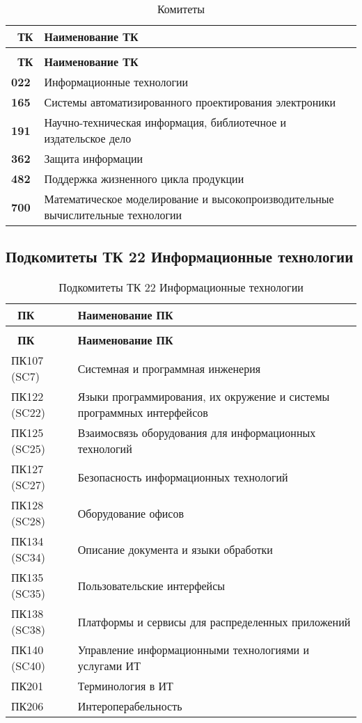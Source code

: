\begin{longtable}{|p{2cm}|p{14cm}|}
	\caption{Комитеты} \label{table:tk} \\
	\hline
	\textbf{\No\ ТК}
	& \textbf{Наименование ТК} \\
	\hline
	\endfirsthead
	\conttable{table:tk} \\
	\hline
	\textbf{\No\ ТК}
	& \textbf{Наименование ТК} \\
	\hline
	\endhead
	\textbf{022} & Информационные технологии \\ \hline
	\textbf{165}
	& Системы автоматизированного проектирования электроники \\ \hline
	\textbf{191}
	& Научно-техническая информация, библиотечное и издательское дело \\ \hline
	\textbf{362}
	& Защита информации \\ \hline
	\textbf{482}
	& Поддержка жизненного цикла продукции \\ \hline
	\textbf{700}
	& Математическое моделирование
		и высокопроизводительные вычислительные технологии \\ \hline
\end{longtable}

\subsection{Подкомитеты ТК 22 Информационные технологии}

\begin{longtable}{|p{2cm}|p{14cm}|}
	\caption{Подкомитеты ТК 22 Информационные технологии}
	\label{table:tk:22} \\
	\hline
	\textbf{\No\ ПК}
	& \textbf{Наименование ПК} \\
	\hline
	\endfirsthead
	\conttable{table:tk:22} \\
	\hline
	\textbf{\No\ ПК}
	& \textbf{Наименование ПК} \\
	\hline
	\endhead
	ПК107 (SC7) & Системная и программная инженерия \\ \hline
	ПК122 (SC22)
	& Языки программирования, их окружение
	и системы программных интерфейсов \\ \hline
	ПК125 (SC25)
	& Взаимосвязь оборудования для информационных технологий \\ \hline
	ПК127 (SC27) & Безопасность информационных технологий \\ \hline
	ПК128 (SC28) & Оборудование офисов \\ \hline
	ПК134 (SC34) & Описание документа и языки обработки \\ \hline
	ПК135 (SC35) & Пользовательские интерфейсы \\ \hline
	ПК138 (SC38) & Платформы и сервисы для распределенных приложений \\ \hline
	ПК140 (SC40)
	& Управление информационными технологиями и услугами ИТ \\ \hline
	ПК201 & Терминология в ИТ \\ \hline
	ПК206 & Интероперабельность \\ \hline
\end{longtable}

